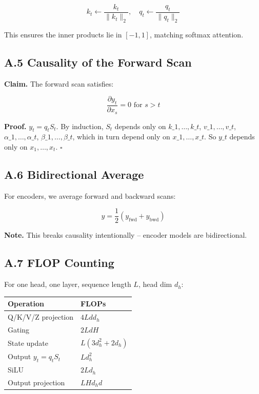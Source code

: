 \[
k_t \leftarrow \frac{k_t}{\|k_t\|_2}, \quad
q_t \leftarrow \frac{q_t}{\|q_t\|_2}
\tag{A.5}
\]

This ensures the inner products lie in $[-1, 1]$, matching softmax attention.

\subsection{A.5 Causality of the Forward Scan}

\textbf{Claim.} The forward scan satisfies:

\[
\frac{\partial y_t}{\partial x_s} = 0 \text{ for } s > t
\tag{A.6}
\]

\textbf{Proof.} $y_t = q_t S_t$. By induction, $S_t$ depends only on $k\_1, 
\dots, k\_t$, $v\_1, \dots, v\_t$, $\alpha\_1, \dots, \alpha\_t$, $\beta\_1, 
\dots, \beta\_t$, which in turn depend only on $x\_1, \dots, x\_t$. So $y\_t$ 
depends only on $x_1, \dots, x_t$. $\square$

\subsection{A.6 Bidirectional Average}

For encoders, we average forward and backward scans:

\[
y = \frac{1}{2}(y_\text{fwd} + y_\text{bwd})
\tag{A.7}
\]

\textbf{Note.} This breaks causality intentionally -- encoder models are 
bidirectional.

\subsection{A.7 FLOP Counting}

For one head, one layer, sequence length $L$, head dim $d_h$:

\begin{table}[H]
\centering
\small
\begin{tabular}{ll}
\toprule
\textbf{Operation} & \textbf{FLOPs} \\
\midrule
Q/K/V/Z projection & $4 L d d_h$ \\
Gating & $2 L d H$ \\
State update & $L (3 d_h^2 + 2 d_h)$ \\
Output $y_t = q_t S_t$ & $L d_h^2$ \\
SiLU & $2 L d_h$ \\
Output projection & $L H d_h d$ \\
\bottomrule
\end{tabular}
\end{table}

